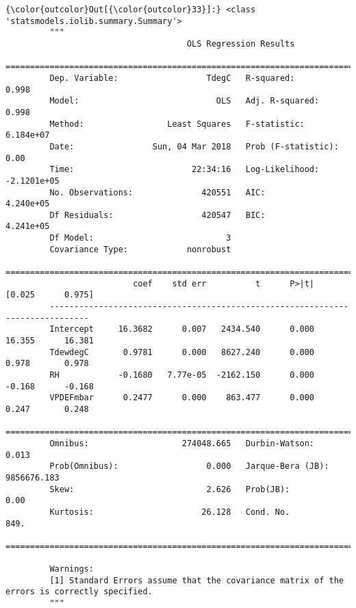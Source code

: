 \documentclass[11pt]{article}
\begin{document}
\begin{Verbatim}[commandchars=\\\{\}]
{\color{outcolor}Out[{\color{outcolor}33}]:} <class 'statsmodels.iolib.summary.Summary'>
         """
                                     OLS Regression Results                            
         ==============================================================================
         Dep. Variable:                  TdegC   R-squared:                       0.998
         Model:                            OLS   Adj. R-squared:                  0.998
         Method:                 Least Squares   F-statistic:                 6.184e+07
         Date:                Sun, 04 Mar 2018   Prob (F-statistic):               0.00
         Time:                        22:34:16   Log-Likelihood:            -2.1201e+05
         No. Observations:              420551   AIC:                         4.240e+05
         Df Residuals:                  420547   BIC:                         4.241e+05
         Df Model:                           3                                         
         Covariance Type:            nonrobust                                         
         ==============================================================================
                          coef    std err          t      P>|t|      [0.025      0.975]
         ------------------------------------------------------------------------------
         Intercept     16.3682      0.007   2434.540      0.000      16.355      16.381
         TdewdegC       0.9781      0.000   8627.240      0.000       0.978       0.978
         RH            -0.1680   7.77e-05  -2162.150      0.000      -0.168      -0.168
         VPDEFmbar      0.2477      0.000    863.477      0.000       0.247       0.248
         ==============================================================================
         Omnibus:                   274048.665   Durbin-Watson:                   0.013
         Prob(Omnibus):                  0.000   Jarque-Bera (JB):          9856676.183
         Skew:                           2.626   Prob(JB):                         0.00
         Kurtosis:                      26.128   Cond. No.                         849.
         ==============================================================================
         
         Warnings:
         [1] Standard Errors assume that the covariance matrix of the errors is correctly specified.
         """
\end{Verbatim}
            
\end{document}
